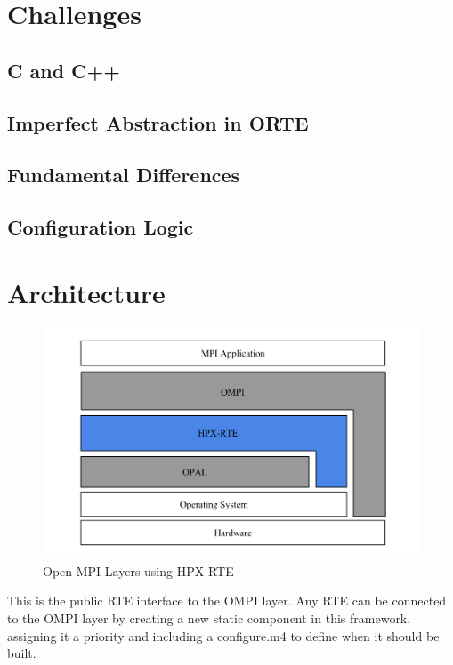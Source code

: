\section{Challenges}
\label{sec:challenges}

\subsection{C and C++}
\subsection{Imperfect Abstraction in ORTE}
\subsection{Fundamental Differences}
\subsection{Configuration Logic}

\section{Architecture}
\label{sec:architecture}

\begin{figure}[ht]
\centering
\includegraphics[scale=0.45]{images/open-mpi-layers-hpx-rte.png}
\caption[Open MPI Layers using HPX-RTE]{Open MPI Layers using HPX-RTE}
\label{fig:open-mpi-layers-hpx-rte}
\end{figure}

\iffalse
 This is the public RTE interface to the OMPI layer. Any RTE can be
 connected to the OMPI layer by creating a new static component in
 this framework, assigning it a priority and including a configure.m4
 to define when it should be built.

